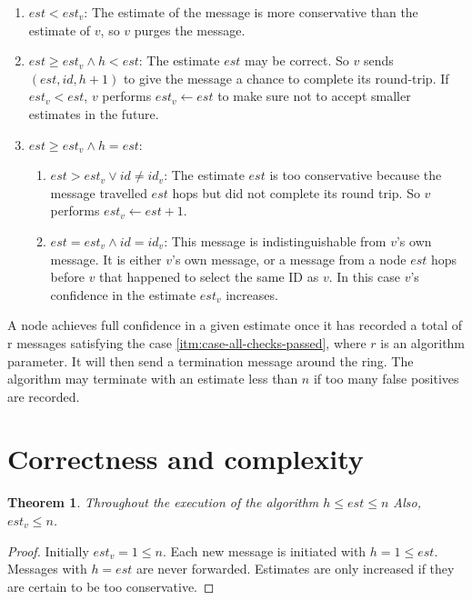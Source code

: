 \documentclass[a4paper,12pt]{article}
\newtheorem{theorem}{Theorem}
\begin{document}
\begin{enumerate}
\item $est < est_{v}$: The estimate of the message is more conservative than the estimate of $v$, so $v$ purges the message.
\item $est \geq est_{v} \land h < est$: The estimate $est$ may be correct. So $v$ sends $(est,id,h+1)$ to give the message a chance to complete its round-trip. If $est_{v} < est$, $v$ performs $est_{v}\leftarrow est$ to make sure not to accept smaller estimates in the future.\label{itm:case-forwarding}
\item $est \geq est_{v} \land h=est$:
\begin{enumerate}
\item $est > est_{v} \lor id \neq id_{v}$: The estimate $est$ is too conservative because the message travelled $est$ hops but did not complete its round trip. So $v$ performs $est_{v}\leftarrow est+1$.
\item $est = est_{v} \land id = id_{v}$: This message is indistinguishable from $v$'s own message. It is either $v$'s own message, or a message from a node $est$ hops before $v$ that happened to select the same ID as $v$. In this case $v$'s confidence in the estimate $est_{v}$ increases.\label{itm:case-all-checks-passed}
\end{enumerate}
\end{enumerate}

A node achieves full confidence in a given estimate once it has recorded a total of r messages satisfying the case \ref{itm:case-all-checks-passed}, where $r$ is an algorithm parameter. It will then send a termination message around the ring. The algorithm may terminate with an estimate less than $n$ if too many false positives are recorded.

\section{Correctness and complexity}

\begin{theorem}
Throughout the execution of the algorithm $h \leq est \leq n$ Also, $est_v\leq n$.
\end{theorem}
\begin{proof}
Initially $est_v = 1 \leq n$.
Each new message is initiated with $h = 1 \leq est$.
Messages with $h=est$ are never forwarded.
Estimates are only increased if they are certain to be too conservative.
\end{proof}
\end{document}
